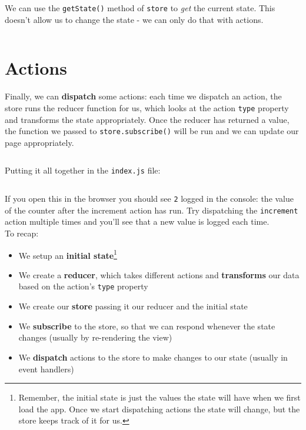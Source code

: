 We can use the \texttt{getState()} method of \texttt{store} to \textit{get} the current state. This doesn't allow us to change the state - we can only do that with actions.

\inputminted{jsx}{01/figures/02/06-subscribe.js}



\section{Actions}

Finally, we can \textbf{dispatch} some actions: each time we dispatch an action, the store runs the reducer function for us, which looks at the action \texttt{type} property and transforms the state appropriately. Once the reducer has returned a value, the function we passed to \texttt{store.subscribe()} will be run and we can update our page appropriately.

\inputminted{jsx}{01/figures/02/07-dispatch.js}

\hr


Putting it all together in the \texttt{index.js} file:

\inputminted{jsx}{01/figures/02/08-all.js}

If you open this in the browser you should see \texttt{2} logged in the console: the value of the counter after the increment action has run. Try dispatching the \texttt{increment} action multiple times and you'll see that a new value is logged each time.
\\

To recap:

\begin{itemize}
    \item We setup an \textbf{initial state}\footnote{Remember, the initial state is just the values the state will have when we first load the app. Once we start dispatching actions the state will change, but the store keeps track of it for us.}
    \item We create a \textbf{reducer}, which takes different actions and \textbf{transforms} our data based on the action's \texttt{type} property
    \item We create our \textbf{store} passing it our reducer and the initial state
    \item We \textbf{subscribe} to the store, so that we can respond whenever the state changes (usually by re-rendering the view)
    \item We \textbf{dispatch} actions to the store to make changes to our state (usually in event handlers)
\end{itemize}


